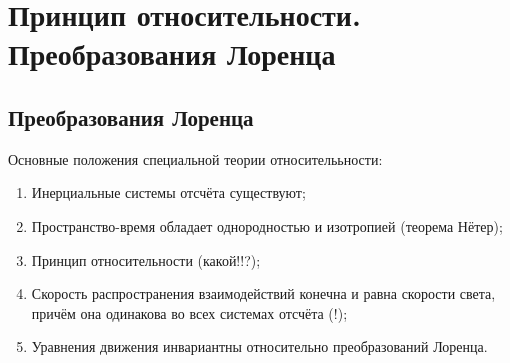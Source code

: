 \newpage
\section{Принцип относительности. Преобразования Лоренца}
\subsection{Преобразования Лоренца}

Основные положения специальной теории относителььности:
\begin{enumerate}
    \item Инерциальные системы отсчёта существуют;
    \item Пространство-время обладает однородностью и изотропией (теорема Нётер);
    \item Принцип относительности (какой!!?);
    \item Скорость распространения взаимодействий конечна и равна скорости света, причём она одинакова во всех системах отсчёта (!);
    \item Уравнения движения инвариантны относительно преобразований Лоренца.
\end{enumerate}

